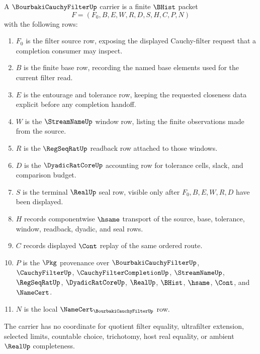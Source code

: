 \begin{definition}
\label{def:bourbaki-cauchy-filter-carrier}
A $\BourbakiCauchyFilterUp$ carrier is a finite $\BHist$ packet
$$
F=(F_0,B,E,W,R,D,S,H,C,P,N)
$$
with the following rows:
\begin{enumerate}
\item $F_0$ is the filter source row, exposing the displayed Cauchy-filter request that a completion consumer may inspect.
\item $B$ is the finite base row, recording the named base elements used for the current filter read.
\item $E$ is the entourage and tolerance row, keeping the requested closeness data explicit before any completion handoff.
\item $W$ is the $\StreamNameUp$ window row, listing the finite observations made from the source.
\item $R$ is the $\RegSeqRatUp$ readback row attached to those windows.
\item $D$ is the $\DyadicRatCoreUp$ accounting row for tolerance cells, slack, and comparison budget.
\item $S$ is the terminal $\RealUp$ seal row, visible only after $F_0,B,E,W,R,D$ have been displayed.
\item $H$ records componentwise $\hsame$ transport of the source, base, tolerance, window, readback, dyadic, and seal rows.
\item $C$ records displayed $\Cont$ replay of the same ordered route.
\item $P$ is the $\Pkg$ provenance over $\BourbakiCauchyFilterUp$, $\CauchyFilterUp$, $\CauchyFilterCompletionUp$, $\StreamNameUp$, $\RegSeqRatUp$, $\DyadicRatCoreUp$, $\RealUp$, $\BHist$, $\hsame$, $\Cont$, and $\NameCert$.
\item $N$ is the local $\NameCert_{\BourbakiCauchyFilterUp}$ row.
\end{enumerate}
The carrier has no coordinate for quotient filter equality, ultrafilter extension, selected limits, countable choice, trichotomy, host real equality, or ambient $\RealUp$ completeness.
\end{definition}

